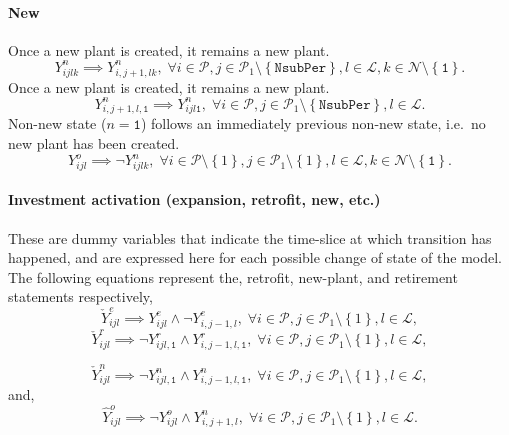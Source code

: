 \documentclass{amsbook}
\begin{document}
\paragraph{New}
%
Once a new plant is created, it remains a new plant.
%
\begin{equation}
    Y^n_{ijlk} \implies Y^n_{i, j+1, lk}, \; \forall 
    i \in \mathcal{P},
    j \in \mathcal{P}_1 \setminus \left\{\mathtt{NsubPer}\right\},
    l\in \mathcal{L},
    k\in \mathcal{N} \setminus \left\{\mathtt{1}\right\}.
\end{equation}
%
Once a new plant is created, it remains a new plant.
%
\begin{equation}
    Y^n_{i, j+1, l,\mathtt{1}} \implies Y^n_{ijl\mathtt{1}} , \; \forall 
    i \in \mathcal{P},
    j \in \mathcal{P}_1 \setminus \left\{\mathtt{NsubPer}\right\},
    l\in \mathcal{L}.
\end{equation}
%
Non-new state ($n=\mathtt{1}$) follows an immediately previous non-new
state, i.e.\ no new plant has been created.
%
\begin{equation}
    Y^o_{ijl} \implies \neg Y^n_{ijlk}, \;
    \forall i \in \mathcal{P} \setminus \left\{1\right\},
    j \in \mathcal{P}_1 \setminus \left\{1\right\},
    l \in \mathcal{L},
    k \in \mathcal{N} \setminus \left\{\mathtt{1}\right\}.
\end{equation}
%
\paragraph{Investment activation (expansion, retrofit, new, etc.)}
These are dummy variables that indicate the time-slice at which transition has
happened, and are expressed here for each possible change of state of the model.
The following equations represent the, retrofit, new-plant, and retirement
statements respectively,
%
\begin{equation}
    \check{Y}^e_{ijl} \implies Y^e_{ijl} \wedge \neg Y^e_{i,j-1,l}, \;
    \forall i \in \mathcal{P} ,
    j \in \mathcal{P}_1 \setminus \left\{1\right\},
    l \in \mathcal{L},
\end{equation}
%
\begin{equation}
    \check{Y}^r_{ijl} \implies 
    \neg Y^r_{ijl,\mathtt{1}} \wedge 
    Y^r_{i,j-1,l,\mathtt{1}}, \;
    \forall i \in \mathcal{P} ,
    j \in \mathcal{P}_1 \setminus \left\{1\right\},
    l \in \mathcal{L},
\end{equation}

\begin{equation}
    \check{Y}^n_{ijl} \implies 
    \neg Y^n_{ijl,\mathtt{1}} \wedge 
    Y^n_{i,j-1,l,\mathtt{1}}, \;
    \forall i \in \mathcal{P} ,
    j \in \mathcal{P}_1 \setminus \left\{1\right\},
    l \in \mathcal{L},
\end{equation}
%
and,
%
\begin{equation}
    \hat{Y}^o_{ijl} \implies 
    \neg Y^o_{ijl} \wedge 
    Y^n_{i,j+1,l}, \;
    \forall i \in \mathcal{P} ,
    j \in \mathcal{P}_1 \setminus \left\{1\right\},
    l \in \mathcal{L}.
\end{equation}
\end{document}
